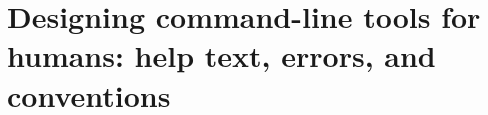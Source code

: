 \chapter{Designing command-line tools for humans: help text, errors, and conventions}
\label{ch:designing-command-line-tools-for-humans}

